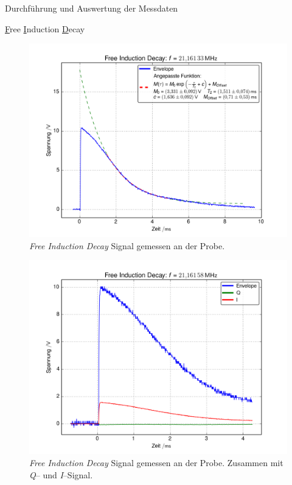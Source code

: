 \documentclass[pdftex, a4paper,11pt, twoside, ngerman]{report}
\begin{document}
\begin{chapter}{Durchführung und Auswertung der Messdaten}
\begin{section}{
        \underline{F}ree \underline{I}nduction \underline{D}ecay}
      \begin{figure}[htb]
        \centering
        \includegraphics[width=\textwidth]{Figures/FID_env2.png}
        \caption{\textit{Free Induction Decay} Signal gemessen an der Probe.}
        \label{figFIDenv}
      \end{figure}
      
      \begin{figure}[htb]
        \centering
        \includegraphics[width=\textwidth]{Figures/FID_env_Q_I0.png}
        \caption{\textit{Free Induction Decay} Signal gemessen an der Probe.
          Zusammen mit \textit{Q}-- und \textit{I}--Signal.}
        \label{figFIDenvQI}
      \end{figure}
      

\end{section}
\end{chapter}
\end{document}
